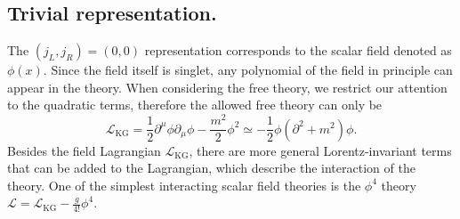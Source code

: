 \documentclass[aps,prb,superscriptaddress,nofootinbib]{revtex4}
\begin{document}
\subsection{Trivial representation.}
The $(j_L,j_R) = (0,0)$ representation corresponds to the scalar field denoted as $\phi(x)$.
Since the field itself is singlet, any polynomial of the field in principle can appear in the theory.
When considering the free theory, we restrict our attention to the quadratic terms, therefore the allowed free theory can only be
\begin{equation}
	\mathcal L_{\mathrm{KG}} = \frac{1}{2}\partial^\mu \phi \partial_\mu \phi -\frac{m^2}{2}\phi^2 
	\simeq -\frac{1}{2}\phi (\partial^2+m^2) \phi.
\end{equation}
Besides the field Lagrangian $\mathcal L_{\mathrm{KG}}$, there are more general Lorentz-invariant terms that can be added to the Lagrangian, which describe the interaction of the theory.
One of the simplest interacting scalar field theories is the $\phi^4$ theory $\mathcal L = \mathcal L_{\mathrm{KG}} - \frac{g}{4!}\phi^4$.
\end{document}

